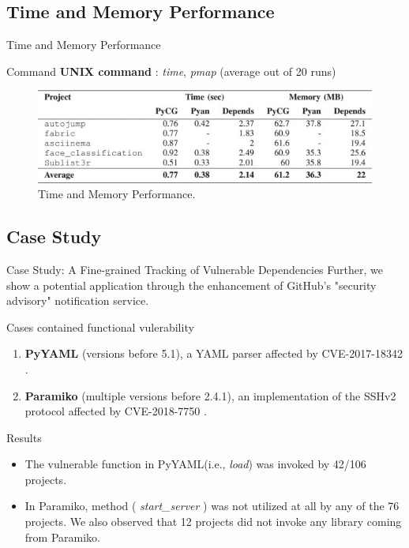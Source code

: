 \documentclass[9pt, xcolor=table]{beamer}
\begin{document}
\subsection{Time and Memory Performance}
\begin{frame}{Time and Memory Performance}
	\begin{block}{Command}
		\textbf{UNIX command} : \textit{time}, \textit{pmap} (average out of 20 runs)
	\end{block}
	\begin{figure}
		\centering
		\includegraphics[width=\textwidth,height=0.5\paperheight]{Time-Memory-Performance.jpg}
		\caption{Time and Memory Performance.}
		\label{fig:Time-Memory-Performance}
	\end{figure}
\end{frame}
%
\subsection{Case Study}
\begin{frame}{Case Study: A Fine-grained Tracking of Vulnerable Dependencies}
	Further, we show a potential application through the enhancement
of GitHub's "security advisory"\cite{Advisory_Database} notification service.

\begin{alertblock}{Cases contained functional vulerability}
	\begin{enumerate}
		\item \textbf{PyYAML}\cite{PyYaml}  (versions before 5.1), a YAML parser affected by CVE-2017-18342 \cite{CVE-2017-18342}.
		\item \textbf{Paramiko}\cite{Paramiko}  (multiple versions before 2.4.1), an
		implementation of the SSHv2 protocol affected by CVE-2018-7750 \cite{CVE-2018-7750}.
	\end{enumerate}
\end{alertblock}

\begin{block}{Results}
	\begin{itemize}
		\item The vulnerable function in PyYAML(i.e., \textit{load}) was invoked by 42/106 projects.
		\item In Paramiko, method ( \textit{start\_server} ) was not utilized at all by any of the 
		76 projects. We also observed that 12 projects did not invoke any library coming from Paramiko.
	\end{itemize} 
\end{block}
\end{frame}
%
%
\end{document}
